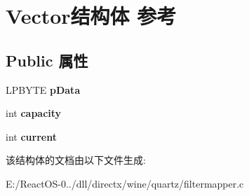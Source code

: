 \hypertarget{struct_vector}{}\section{Vector结构体 参考}
\label{struct_vector}
\subsection*{Public 属性}
\begin{DoxyCompactItemize}
\item 
\mbox{\label{struct_vector_a0b84e7658758276fac7f980f1a1c5a04}} 
L\+P\+B\+Y\+TE {\bfseries p\+Data}
\item 
\mbox{\label{struct_vector_a6d49b240ab4a8ccb9b1c7297e78511da}} 
int {\bfseries capacity}
\item 
\mbox{\label{struct_vector_a8cb577f14bea1a6c1fbf85717b3ee4f9}} 
int {\bfseries current}
\end{DoxyCompactItemize}


该结构体的文档由以下文件生成\+:\begin{DoxyCompactItemize}
\item 
E\+:/\+React\+O\+S-\/0../dll/directx/wine/quartz/filtermapper.\+c\end{DoxyCompactItemize}
